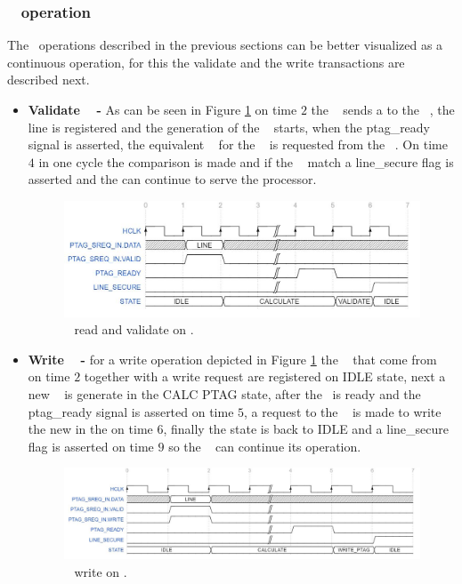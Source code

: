 \subsubsection{\seceng~ operation }
The\seceng~ operations  described in the previous sections can be better visualized  as a continuous operation, for this the validate and the write transactions  are described next.
\begin{itemize}
 \item{\textbf{Validate \ptag~ - }} As can be seen in Figure \ref{fig:ptgag_rd_no_mt}  on time $2$ the \handler~ sends a  \sline to the \seceng~, the line is registered and the generation of the \ptag~ starts, when the ptag\_ready signal is asserted,  the equivalent \ptag~ for the \sline~ is requested from the \ptagmem~. On time $4$ in one cycle the comparison is made and if the \ptags~ match a line\_secure flag is asserted and the  \handler can continue to serve the processor.
 
   \begin{figure}[!ht]
    \centering
    \includegraphics[width=\textwidth]{figures/others/ptag_read_sec_eng.JPG}
    \caption{\ptag~ read and validate on \seceng.}
    \label{fig:ptgag_rd_no_mt}
\end{figure}


 \item{\textbf{Write \ptag~ - }} for a write operation depicted in Figure \ref{fig:ptgag_rd_no_mt} the \sline~ that  come from \handler~  on time $2$ together with a write request are registered on IDLE state, next a new \ptag~ is generate in the CALC PTAG state, after the \ptag~is ready and the ptag\_ready signal is asserted on time $5$, a request to the \pmmu~ is made  to write the new \ptag in the \ptagmem on time $6$, finally the state is back to IDLE  and a line\_secure flag is asserted on time $9$ so the \handler~ can continue its operation. 
   \begin{figure}[!ht]
    \centering
    \includegraphics[width=\textwidth]{figures/others/ptag_write_sec_eng.JPG}
    \caption{\ptag~ write  on \seceng.}
    \label{fig:se_pw_no_mt}
\end{figure}
\end{itemize}

